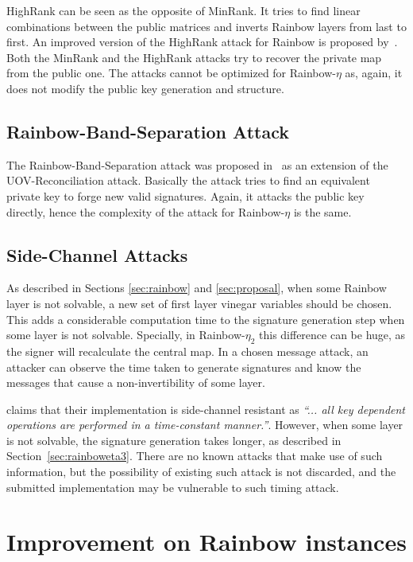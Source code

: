 \documentclass{ufsctex/ufsctex}
\begin{document}
HighRank can be seen as the opposite of MinRank. It tries to find linear
combinations between the public matrices and inverts Rainbow layers from last
to first. An improved version of the HighRank attack for Rainbow is proposed
by~\cite{ding2008new}. Both the MinRank and the HighRank attacks try to recover
the private map from the public one. The attacks cannot be optimized for
Rainbow-$\eta$ as, again, it does not modify the public key generation and
structure.

\subsection{Rainbow-Band-Separation Attack}

The Rainbow-Band-Separation attack was proposed in~\cite{ding2008new} as an
extension of the UOV-Reconciliation attack. Basically the attack tries to find
an equivalent private key to forge new valid signatures. Again, it attacks the
public key directly, hence the complexity of the attack for Rainbow-$\eta$ is
the same.

\subsection{Side-Channel Attacks}

As described in Sections \ref{sec:rainbow} and \ref{sec:proposal}, when some
Rainbow layer is not solvable, a new set of first layer vinegar variables
should be chosen. This adds a considerable computation time to the signature
generation step when some layer is not solvable. Specially, in Rainbow-$\eta_2$
this difference can be huge, as the signer will recalculate the central map. In
a chosen message attack, an attacker can observe the time taken to generate
signatures and know the messages that cause a non-invertibility of some layer.

\cite{ding2017nist} claims that their implementation is side-channel resistant
as \textit{``... all key dependent operations are performed in a time-constant
manner.''}. However, when some layer is not solvable, the signature generation
takes longer, as described in Section~\ref{sec:rainboweta3}. There are no known
attacks that make use of such information, but the possibility of existing such
attack is not discarded, and the submitted implementation may be vulnerable to
such timing attack.

\section{Improvement on Rainbow instances}
\end{document}
